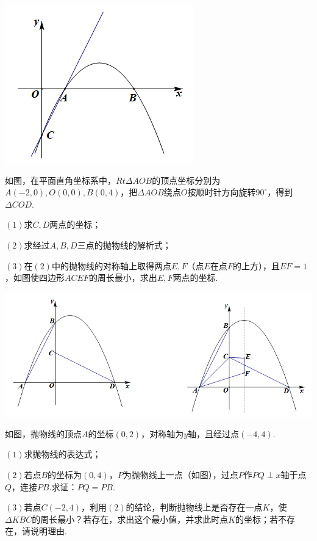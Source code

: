 \documentclass[10pt]{ctexart}
\begin{document}
\raggedleft
\includegraphics[scale=0.6]{figure/g-25.PNG} 
\begin{jply}{}{}
  如图，在平面直角坐标系中，$Rt\Delta AOB$的顶点坐标分别为$A(-2,0),O(0,0),B(0,4)$，把$\Delta AOB$绕点$O$按顺时针方向旋转$90^\circ$，得到$\Delta COD$.
  
  $(1)$求$C,D$两点的坐标；
  
  $(2)$求经过$A,B,D$三点的抛物线的解析式；
  
  $(3)$在$(2)$中的抛物线的对称轴上取得两点$E,F$（点$E$在点$F$的上方），且$EF=1$，如图使四边形$ACEF$的周长最小，求出$E,F$两点的坐标.
\end{jply}

\centering
\includegraphics[scale=0.6]{figure/g-26.PNG} 
\begin{jply}{}{}
 如图，抛物线的顶点$A$的坐标$(0,2)$，对称轴为$y$轴，且经过点$(-4,4)$.
 
 $(1)$求抛物线的表达式；
 
 $(2)$若点$B$的坐标为$(0,4)$，$P$为抛物线上一点（如图），过点$P$作$PQ\perp x$轴于点$Q$，连接$PB$.求证：$PQ=PB$.
 
 $(3)$若点$C(-2,4)$，利用$(2)$的结论，判断抛物线上是否存在一点$K$，使$\Delta KBC$的周长最小？若存在，求出这个最小值，并求此时点$K$的坐标；若不存在，请说明理由.
\end{jply}
\end{document}
